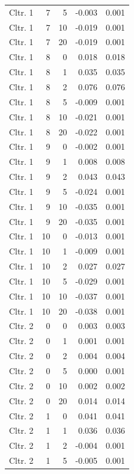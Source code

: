 \begin{longtable}{lrrrr}
  Cltr. 1 &    7 &    5 & -0.003 & 0.001 \\ 
  Cltr. 1 &    7 &   10 & -0.019 & 0.001 \\ 
  Cltr. 1 &    7 &   20 & -0.019 & 0.001 \\ 
  Cltr. 1 &    8 &    0 & 0.018 & 0.018 \\ 
  Cltr. 1 &    8 &    1 & 0.035 & 0.035 \\ 
  Cltr. 1 &    8 &    2 & 0.076 & 0.076 \\ 
  Cltr. 1 &    8 &    5 & -0.009 & 0.001 \\ 
  Cltr. 1 &    8 &   10 & -0.021 & 0.001 \\ 
  Cltr. 1 &    8 &   20 & -0.022 & 0.001 \\ 
  Cltr. 1 &    9 &    0 & -0.002 & 0.001 \\ 
  Cltr. 1 &    9 &    1 & 0.008 & 0.008 \\ 
  Cltr. 1 &    9 &    2 & 0.043 & 0.043 \\ 
  Cltr. 1 &    9 &    5 & -0.024 & 0.001 \\ 
  Cltr. 1 &    9 &   10 & -0.035 & 0.001 \\ 
  Cltr. 1 &    9 &   20 & -0.035 & 0.001 \\ 
  Cltr. 1 &   10 &    0 & -0.013 & 0.001 \\ 
  Cltr. 1 &   10 &    1 & -0.009 & 0.001 \\ 
  Cltr. 1 &   10 &    2 & 0.027 & 0.027 \\ 
  Cltr. 1 &   10 &    5 & -0.029 & 0.001 \\ 
  Cltr. 1 &   10 &   10 & -0.037 & 0.001 \\ 
  Cltr. 1 &   10 &   20 & -0.038 & 0.001 \\ 
  Cltr. 2 &    0 &    0 & 0.003 & 0.003 \\ 
  Cltr. 2 &    0 &    1 & 0.001 & 0.001 \\ 
  Cltr. 2 &    0 &    2 & 0.004 & 0.004 \\ 
  Cltr. 2 &    0 &    5 & 0.000 & 0.001 \\ 
  Cltr. 2 &    0 &   10 & 0.002 & 0.002 \\ 
  Cltr. 2 &    0 &   20 & 0.014 & 0.014 \\ 
  Cltr. 2 &    1 &    0 & 0.041 & 0.041 \\ 
  Cltr. 2 &    1 &    1 & 0.036 & 0.036 \\ 
  Cltr. 2 &    1 &    2 & -0.004 & 0.001 \\ 
  Cltr. 2 &    1 &    5 & -0.005 & 0.001 \\ 

\end{longtable}
